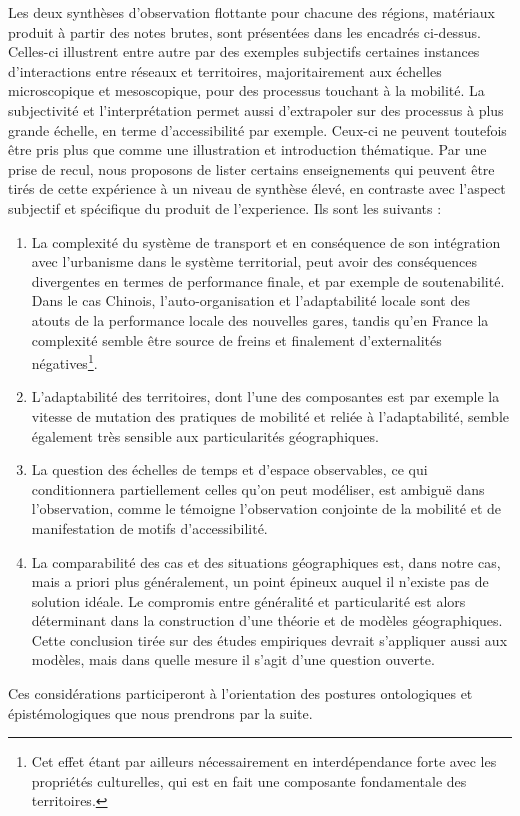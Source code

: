 Les deux synthèses d'observation flottante pour chacune des régions, matériaux produit à partir des notes brutes, sont présentées dans les encadrés ci-dessus. Celles-ci illustrent entre autre par des exemples subjectifs certaines instances d'interactions entre réseaux et territoires, majoritairement aux échelles microscopique et mesoscopique, pour des processus touchant à la mobilité. La subjectivité et l'interprétation permet aussi d'extrapoler sur des processus à plus grande échelle, en terme d'accessibilité par exemple. Ceux-ci ne peuvent toutefois être pris plus que comme une illustration et introduction thématique. Par une prise de recul, nous proposons de lister certains enseignements qui peuvent être tirés de cette expérience à un niveau de synthèse élevé, en contraste avec l'aspect subjectif et spécifique du produit de l'experience. Ils sont les suivants :

\begin{enumerate}
	\item La complexité du système de transport et en conséquence de son intégration avec l'urbanisme dans le système territorial, peut avoir des conséquences divergentes en termes de performance finale, et par exemple de soutenabilité. Dans le cas Chinois, l'auto-organisation et l'adaptabilité locale sont des atouts de la performance locale des nouvelles gares, tandis qu'en France la complexité semble être source de freins et finalement d'externalités négatives\footnote{Cet effet étant par ailleurs nécessairement en interdépendance forte avec les propriétés culturelles, qui est en fait une composante fondamentale des territoires.}. %
	\item L'adaptabilité des territoires, dont l'une des composantes est par exemple la vitesse de mutation des pratiques de mobilité et reliée à l'adaptabilité, semble également très sensible aux particularités géographiques.
	\item La question des échelles de temps et d'espace observables, ce qui conditionnera partiellement celles qu'on peut modéliser, est ambiguë dans l'observation, comme le témoigne l'observation conjointe de la mobilité et de manifestation de motifs d'accessibilité.
	\item La comparabilité des cas et des situations géographiques est, dans notre cas, mais a priori plus généralement, un point épineux auquel il n'existe pas de solution idéale. Le compromis entre généralité et particularité est alors déterminant dans la construction d'une théorie et de modèles géographiques. Cette conclusion tirée sur des études empiriques devrait s'appliquer aussi aux modèles, mais dans quelle mesure il s'agit d'une question ouverte.%
\end{enumerate}


Ces considérations participeront à l'orientation des postures ontologiques et épistémologiques que nous prendrons par la suite.




\stars




